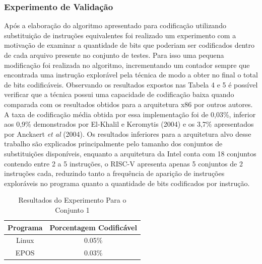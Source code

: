\subsubsection{Experimento de Validação}

Após a elaboração do algoritmo apresentado para codificação utilizando substituição de instruções equivalentes foi realizado um experimento com a motivação de examinar a quantidade de bits que poderiam ser codificados dentro de cada arquivo presente no conjunto de testes. Para isso uma pequena modificação foi realizada no algoritmo, incrementando um contador sempre que encontrada uma instrução explorável pela técnica de modo a obter no final o total de bits codificáveis. Observando os resultados expostos nas Tabela 4 e 5 é possível verificar que a técnica possui uma capacidade de codificação baixa quando comparada com os resultados obtidos para a arquitetura x86 por outros autores. A taxa de codificação média obtida por essa implementação foi de 0,03\%, inferior aos 0,9\% demonstrados por El-Khalil e Keromytis (2004) e os 3,7\% apresentados por Anckaert \textit{et al} (2004). Os resultados inferiores para a arquitetura alvo desse trabalho são explicados principalmente pelo tamanho dos conjuntos de substituições disponíveis, enquanto a arquitetura da Intel conta com 18 conjuntos contendo entre 2 a 5 instruções, o RISC-V apresenta apenas 5 conjuntos de 2 instruções cada, reduzindo tanto a frequência de aparição de instruções exploráveis no programa quanto a quantidade de bits codificados por instrução. 

\begin{table}[htb]
    \centering
    
    \begin{tabular}{|c|c|}
        \hline
        Programa & Porcentagem Codificável \\
        \hline
        Linux & 0.05\% \\
        \hline
        EPOS & 0.03\% \\
        \hline
    \end{tabular}
    \caption{Resultados do Experimento Para o Conjunto 1}
    \label{tab:exp2_1}
\end{table}

